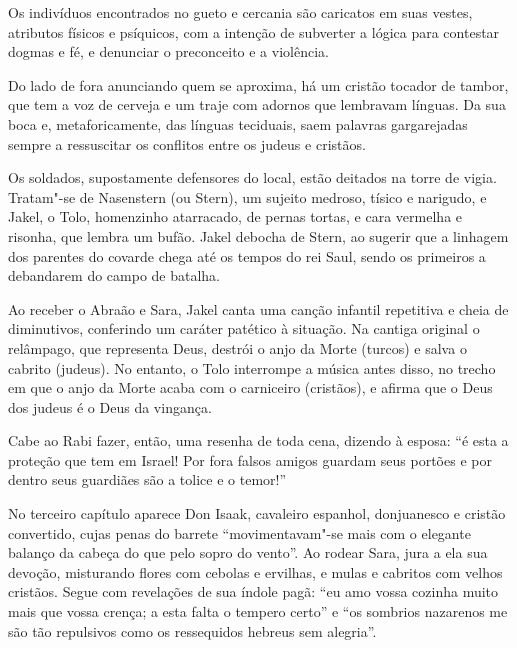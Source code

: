 \documentclass[12pt]{extarticle}
\begin{document}
Os indivíduos encontrados no gueto e cercania são caricatos em suas
vestes, atributos físicos e psíquicos, com a intenção de subverter a
lógica para contestar dogmas e fé, e denunciar o preconceito e a
violência.

Do lado de fora anunciando quem se aproxima, há um cristão tocador de
tambor, que tem a voz de cerveja e um traje com adornos que lembravam
línguas. Da sua boca e, metaforicamente, das línguas teciduais, saem
palavras gargarejadas sempre a ressuscitar os conflitos entre os judeus
e cristãos.

Os soldados, supostamente defensores do local, estão deitados na torre
de vigia. Tratam"-se de Nasenstern (ou Stern), um sujeito medroso, tísico
e narigudo, e Jakel, o Tolo, homenzinho atarracado, de pernas tortas, e
cara vermelha e risonha, que lembra um bufão. Jakel debocha de Stern, ao
sugerir que a linhagem dos parentes do covarde chega até os tempos do
rei Saul, sendo os primeiros a debandarem do campo de batalha.

Ao receber o Abraão e Sara, Jakel canta uma canção infantil repetitiva e
cheia de diminutivos, conferindo um caráter patético à situação. Na
cantiga original o relâmpago, que representa Deus, destrói o anjo da
Morte (turcos) e salva o cabrito (judeus). No entanto, o Tolo interrompe
a música antes disso, no trecho em que o anjo da Morte acaba com o
carniceiro (cristãos), e afirma que o Deus dos judeus é o Deus da
vingança.




Cabe ao Rabi fazer, então, uma resenha de toda cena, dizendo à esposa:
``é esta a proteção que tem em Israel! Por fora falsos amigos guardam
seus portões e por dentro seus guardiães são a tolice e o temor!''

No terceiro capítulo aparece Don Isaak, cavaleiro espanhol, donjuanesco
e cristão convertido, cujas penas do barrete ``movimentavam"-se mais com
o elegante balanço da cabeça do que pelo sopro do vento''. Ao rodear
Sara, jura a ela sua devoção, misturando flores com cebolas e ervilhas,
e mulas e cabritos com velhos cristãos. Segue com revelações de sua
índole pagã: ``eu amo vossa cozinha muito mais que vossa crença; a esta
falta o tempero certo'' e ``os sombrios nazarenos me são tão repulsivos
como os ressequidos hebreus sem alegria''.


\end{document}
